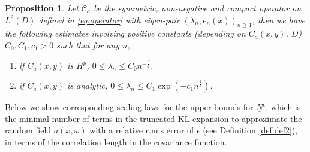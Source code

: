 \documentclass[11pt]{amsart}
\newtheorem{proposition}{Proposition}[section]
\newcommand{\w}{\omega}
\begin{document}
\begin{proposition}
\label{prop:decay}
Let $\mathcal{C}_a$ be the symmetric, non-negative and compact operator on $L^2(D)$ defined in \eqref{eq:operator} with eigen-pair $(\lambda_n, e_n(x))_{n\ge 1}$, then we have the following estimates involving positive constants (depending on $C_a(x,y)$, $D$) $C_0, C_1, c_1 >0$ such that for any $n$,

\begin{enumerate}
\item
if $C_a(x,y)$ is $H^p$, $0\le \lambda_n \le C_0 n^{-\frac{p}{d}}$.
\item
if $C_a(x,y)$ is analytic, $0\le \lambda_n \le C_1 \exp(-c_1 n^{\frac{1}{d}})$.
\end{enumerate}
\end{proposition}

Below we show corresponding scaling laws for the upper bounds for $\underline{N}^{\epsilon}$, which is the minimal number of terms in the truncated KL expansion to approximate the random field $a(x,\w)$ with a relative r.m.s error of $\epsilon$ (see Definition \ref{def:def2}), in terms of the correlation length in the covariance function.
\end{document}
